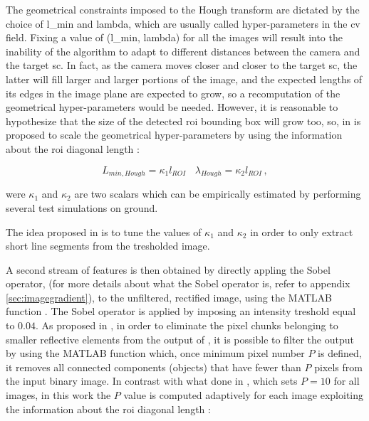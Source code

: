 The geometrical constraints imposed to the Hough transform are dictated by the choice of \gls{l_min} and \gls{lambda}, which are usually called hyper-parameters in the \acrshort{cv} field. Fixing a value of (\gls{l_min}, \gls{lambda}) for all the images will result into the inability of the algorithm to adapt to different distances between the camera and the target \acrshort{sc}. In fact, as the camera moves closer and closer to the target \acrshort{sc}, the latter will fill larger and larger portions of the image, and the expected lengths of its edges in the image plane are expected to grow, so a recomputation of the geometrical hyper-parameters would be needed. However, it is reasonable to hypothesize that the size of the detected \acrshort{roi} bounding box will grow too, so, in \cite{Sharma2018} is proposed to scale the geometrical hyper-parameters by using the information about the \acrshort{roi} diagonal length :

\begin{equation*}
  L_{min,Hough} = \kappa_1 l_{ROI} \ \ \ \  \lambda_{Hough} = \kappa_2 l_{ROI}  \,,
\end{equation*}

were $\kappa_1$ and $\kappa_2$ are two scalars which can be empirically estimated by performing several test simulations on ground.

The idea proposed in \cite{Sharma2018} is to tune the values of $\kappa_1$ and $\kappa_2$ in order to only extract short line segments from the tresholded image.

A second stream of features is then obtained by directly appling the Sobel operator, (for more details about what the Sobel operator is, refer to appendix \ref{sec:imagegradient}), to the unfiltered, rectified image, using the MATLAB function . The Sobel operator is applied by imposing an intensity treshold equal to $0.04$. As proposed in \cite{fracchio2019}, in order to eliminate the pixel chunks belonging to smaller reflective elements from the output of , it is possible to filter the output by using the MATLAB function  which, once minimum pixel number $P$ is defined, it removes all connected components (objects) that have fewer than $P$ pixels from the input binary image. In contrast with what done in \cite{fracchio2019}, which sets $P = 10$ for all images, in this work the $P$ value is computed adaptively for each image exploiting the information about the \acrshort{roi} diagonal length :

